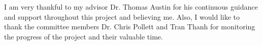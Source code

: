I am very thankful to my advisor Dr. Thomas Austin for his continuous guidance and support throughout this project and believing me. Also, I would like to thank the committee members Dr. Chris Pollett and Tran Thanh for monitoring the progress of the project and their valuable time.